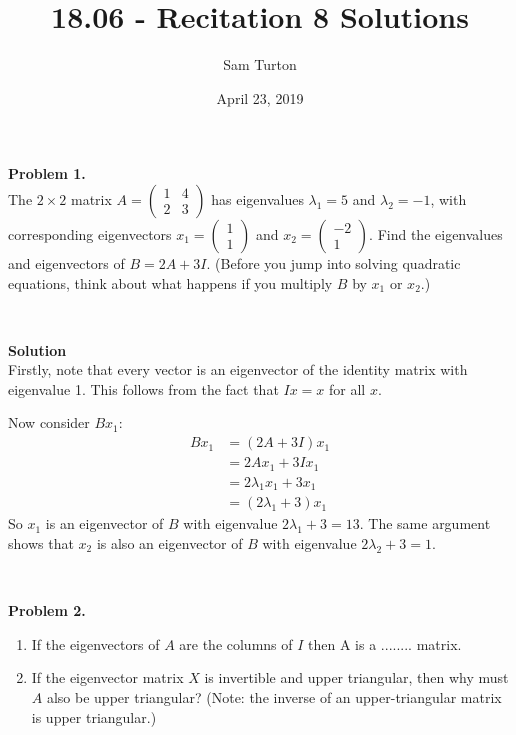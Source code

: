 \documentclass[11pt]{article}
\title{18.06 - Recitation 8 Solutions}
\author{Sam Turton}
\date{April 23, 2019}
\begin{document}
\maketitle

\noindent \textbf{Problem 1.}\\
The $2\times 2$ matrix $A = \begin{pmatrix} 1 & 4 \\ 2 & 3 \end{pmatrix}$ has eigenvalues $\lambda_1 = 5$ and $\lambda_2 = -1$, with corresponding eigenvectors $x_1 = \begin{pmatrix} 1\\1\end{pmatrix}$ and $x_2 = \begin{pmatrix} -2\\1\end{pmatrix}$. Find the eigenvalues and eigenvectors of $B = 2A + 3I$. (Before you jump into solving quadratic equations, think about what happens if you multiply $B$ by $x_1$ or $x_2$.)

\

\noindent \textbf{Solution}\\
Firstly, note that every vector is an eigenvector of the identity matrix with eigenvalue 1. This follows from the fact that $Ix = x$ for all $x$. 

Now consider $Bx_1$:
\begin{align}
Bx_1 &= (2A + 3I) x_1 \\
&= 2Ax_1 +3Ix_1\\
&= 2\lambda_1 x_1 + 3x_1\\
&= (2\lambda_1 + 3)x_1
\end{align}
So $x_1$ is an eigenvector of $B$ with eigenvalue $2\lambda_1 + 3 = 13$. The same argument shows that $x_2$ is also an eigenvector of $B$ with eigenvalue $2\lambda_2 + 3 = 1$. 


\

\noindent \textbf{Problem 2.}\\
\begin{enumerate}
\item If the eigenvectors of $A$ are the columns of $I$ then A is a ........ matrix.
\item If the eigenvector matrix $X$ is invertible and upper triangular, then why must $A$ also be upper triangular?  (Note: the inverse of an upper-triangular matrix is upper triangular.)
\end{enumerate}

\
\end{document}
